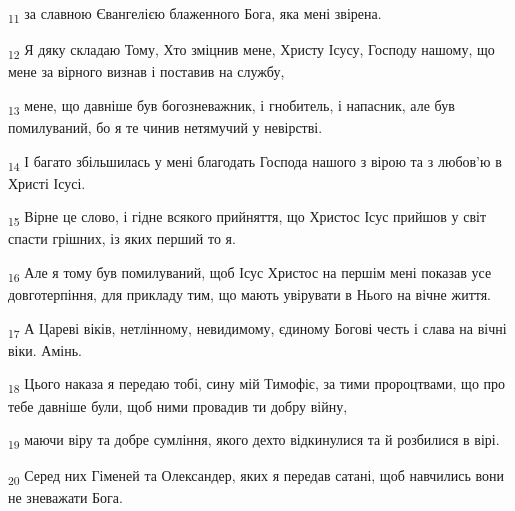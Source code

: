 \begin{tcolorbox}
\textsubscript{11} за славною Євангелією блаженного Бога, яка мені звірена.
\end{tcolorbox}
\begin{tcolorbox}
\textsubscript{12} Я дяку складаю Тому, Хто зміцнив мене, Христу Ісусу, Господу нашому, що мене за вірного визнав і поставив на службу,
\end{tcolorbox}
\begin{tcolorbox}
\textsubscript{13} мене, що давніше був богозневажник, і гнобитель, і напасник, але був помилуваний, бо я те чинив нетямучий у невірстві.
\end{tcolorbox}
\begin{tcolorbox}
\textsubscript{14} І багато збільшилась у мені благодать Господа нашого з вірою та з любов'ю в Христі Ісусі.
\end{tcolorbox}
\begin{tcolorbox}
\textsubscript{15} Вірне це слово, і гідне всякого прийняття, що Христос Ісус прийшов у світ спасти грішних, із яких перший то я.
\end{tcolorbox}
\begin{tcolorbox}
\textsubscript{16} Але я тому був помилуваний, щоб Ісус Христос на першім мені показав усе довготерпіння, для прикладу тим, що мають увірувати в Нього на вічне життя.
\end{tcolorbox}
\begin{tcolorbox}
\textsubscript{17} А Цареві віків, нетлінному, невидимому, єдиному Богові честь і слава на вічні віки. Амінь.
\end{tcolorbox}
\begin{tcolorbox}
\textsubscript{18} Цього наказа я передаю тобі, сину мій Тимофіє, за тими пророцтвами, що про тебе давніше були, щоб ними провадив ти добру війну,
\end{tcolorbox}
\begin{tcolorbox}
\textsubscript{19} маючи віру та добре сумління, якого дехто відкинулися та й розбилися в вірі.
\end{tcolorbox}
\begin{tcolorbox}
\textsubscript{20} Серед них Гіменей та Олександер, яких я передав сатані, щоб навчились вони не зневажати Бога.
\end{tcolorbox}
